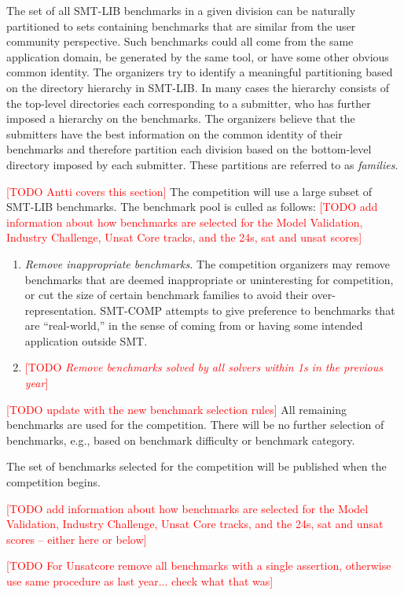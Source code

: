 \documentclass[12pt]{article}
\newcommand{\rem}[1]{\textcolor{red}{[#1]}}
\newcommand{\todo}[1]{\rem{TODO #1}}
\newcommand{\ucore}{Unsat Core\xspace}
\newcommand{\mval}{Model Validation\xspace}
\newcommand{\challenge}{Industry Challenge\xspace}
\begin{document}
\header{Benchmark demographics. \todo{check}}
%
The set of all SMT-LIB benchmarks in a given division can be naturally
partitioned to sets containing benchmarks that are similar from the user
community perspective.  Such benchmarks could all come from the same
application domain, be generated by the same tool, or have some other
obvious common identity.
%
The organizers try to identify a meaningful partitioning based on the
directory hierarchy in SMT-LIB.  In many cases the hierarchy consists of
the top-level directories each corresponding to a submitter, who has
further imposed a hierarchy on the benchmarks.
%
The organizers believe that the submitters have the best information on
the common identity of their benchmarks and therefore partition each
division based on the bottom-level directory imposed by each submitter.
These partitions are referred to as \emph{families}.

 \todo{Antti covers this section}
%
The competition will use a large subset of SMT-LIB benchmarks.  The
benchmark pool is culled as follows:
\todo{add information about how benchmarks are selected for the \mval,
\challenge, \ucore tracks, and the 24s, sat and unsat scores}
\begin{enumerate}
\item \emph{Remove inappropriate benchmarks.} The competition
  organizers may remove benchmarks that are deemed inappropriate or
  uninteresting for competition, or cut the size of certain benchmark
  families to avoid their over-representation.  SMT-COMP attempts to
  give preference to benchmarks that are ``real-world,'' in the sense
  of coming from or having some intended application outside SMT.
\item \todo{\emph{Remove benchmarks solved by all solvers within 1s in the previous year}}
\end{enumerate}
%
\todo{update with the new benchmark selection rules}
All remaining benchmarks are used for the competition.  There will be
no further selection of benchmarks, e.g., based on benchmark
difficulty or benchmark category.

The set of benchmarks selected for the competition will be published
when the competition begins.

\todo{add information about how benchmarks are selected for the \mval,
\challenge, \ucore tracks, and the 24s, sat and unsat scores -- either here
or below}

\todo{For Unsatcore remove all benchmarks with a single assertion, otherwise use same procedure as last year... check what that was}
\end{document}
